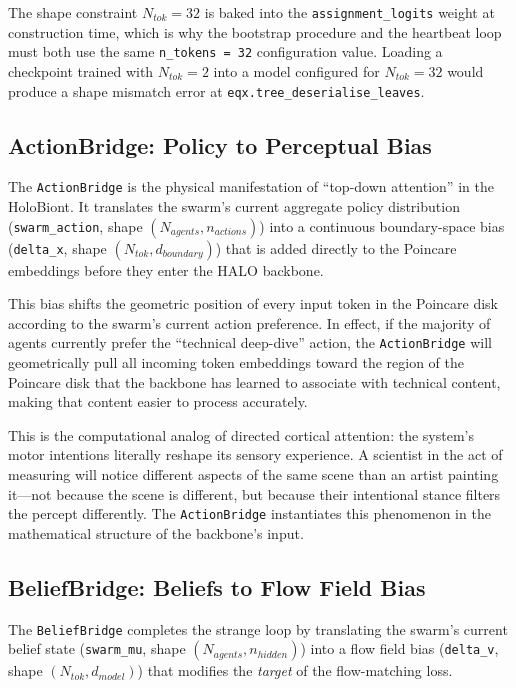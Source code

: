The shape constraint $N_{tok} = 32$ is baked into the \texttt{assignment\_logits} weight at construction time, which is why the bootstrap procedure and the heartbeat loop must both use the same \texttt{n\_tokens = 32} configuration value. Loading a checkpoint trained with $N_{tok} = 2$ into a model configured for $N_{tok} = 32$ would produce a shape mismatch error at \texttt{eqx.tree\_deserialise\_leaves}.

\subsection{ActionBridge: Policy to Perceptual Bias}

The \texttt{ActionBridge} is the physical manifestation of ``top-down attention'' in the HoloBiont. It translates the swarm's current aggregate policy distribution (\texttt{swarm\_action}, shape $(N_{agents}, n_{actions})$) into a continuous boundary-space bias (\texttt{delta\_x}, shape $(N_{tok}, d_{boundary})$) that is added directly to the Poincare embeddings before they enter the HALO backbone.

This bias shifts the geometric position of every input token in the Poincare disk according to the swarm's current action preference. In effect, if the majority of agents currently prefer the ``technical deep-dive'' action, the \texttt{ActionBridge} will geometrically pull all incoming token embeddings toward the region of the Poincare disk that the backbone has learned to associate with technical content, making that content easier to process accurately.

This is the computational analog of directed cortical attention: the system's motor intentions literally reshape its sensory experience. A scientist in the act of measuring will notice different aspects of the same scene than an artist painting it---not because the scene is different, but because their intentional stance filters the percept differently. The \texttt{ActionBridge} instantiates this phenomenon in the mathematical structure of the backbone's input.

\subsection{BeliefBridge: Beliefs to Flow Field Bias}

The \texttt{BeliefBridge} completes the strange loop by translating the swarm's current belief state (\texttt{swarm\_mu}, shape $(N_{agents}, n_{hidden})$) into a flow field bias (\texttt{delta\_v}, shape $(N_{tok}, d_{model})$) that modifies the \textit{target} of the flow-matching loss.


